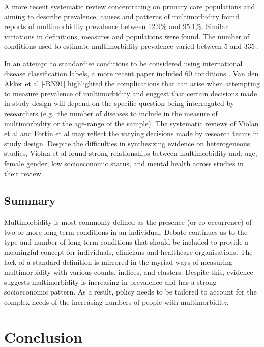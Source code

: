 \documentclass[12pt,]{report}
\begin{document}
A more recent systematic review concentrating on primary care
populations and aiming to describe prevalence, causes and patterns of
multimorbidity \citep{RN15} found reports of multimorbidity prevalence
between 12.9\% and 95.1\%. Similar variations in definitions, measures
and populations were found. The number of conditions used to estimate
multimorbidity prevalence varied between 5 and 335 \citep{RN15}.

In an attempt to standardise conditions to be considered using
international disease classification labels, a more recent paper
included 60 conditions \citep{RN300}. Van den Akker et al {[}-RN91{]}
highlighted the complications that can arise when attempting to measure
prevalence of multimorbidity and suggest that certain decisions made in
study design will depend on the specific question being interrogated by
researchers (e.g.~the number of diseases to include in the measure of
multimorbidity or the age-range of the sample). The systematic reviews
of Violan et al \citeyearpar{RN15} and Fortin et al \citeyearpar{RN56}
may reflect the varying decisions made by research teams in study
design. Despite the difficulties in synthesizing evidence on
heterogeneous studies, Violan et al \citeyearpar{RN15} found strong
relationships between multimorbidity and: age, female gender, low
socioeconomic status, and mental health across studies in their review.

\subsection{Summary}\label{subsec:mm-summary}

Multimorbidity is most commonly defined as the presence (or
co-occurrence) of two or more long-term conditions in an individual.
Debate continues as to the type and number of long-term conditions that
should be included to provide a meaningful concept for individuals,
clinicians and healthcare organisations. The lack of a standard
definition is mirrored in the myriad ways of measuring multimorbidity
with various counts, indices, and clusters. Despite this, evidence
suggests multimorbidity is increasing in prevalence and has a strong
socioeconomic pattern. As a result, policy needs to be tailored to
account for the complex needs of the increasing numbers of people with
multimorbidity.

\section{Conclusion}\label{sec:lit-review-conclusion}
\end{document}
